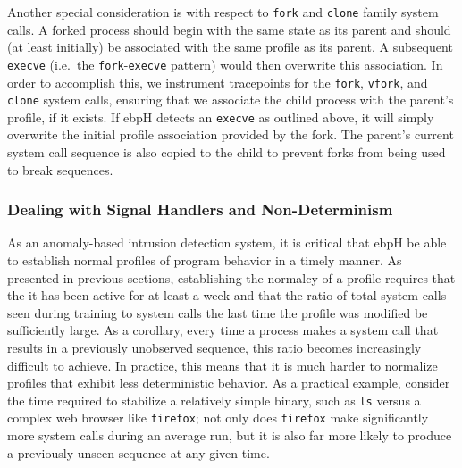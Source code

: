 \documentclass[
  12pt]{findlay}
\begin{document}
Another special consideration is with respect to
\passthrough{\lstinline!fork!} and \passthrough{\lstinline!clone!}
family system calls. A forked process should begin with the same state
as its parent and should (at least initially) be associated with the
same profile as its parent. A subsequent
\passthrough{\lstinline!execve!} (i.e.~the
\passthrough{\lstinline!fork!}-\passthrough{\lstinline!execve!} pattern)
would then overwrite this association. In order to accomplish this, we
instrument tracepoints for the \passthrough{\lstinline!fork!},
\passthrough{\lstinline!vfork!}, and \passthrough{\lstinline!clone!}
system calls, ensuring that we associate the child process with the
parent's profile, if it exists. If ebpH detects an
\passthrough{\lstinline!execve!} as outlined above, it will simply
overwrite the initial profile association provided by the fork. The
parent's current system call sequence is also copied to the child to
prevent forks from being used to break sequences.

\hypertarget{dealing-with-signal-handlers-and-non-determinism}{%
\subsubsection{Dealing with Signal Handlers and
Non-Determinism}\label{dealing-with-signal-handlers-and-non-determinism}}

As an anomaly-based intrusion detection system, it is critical that ebpH
be able to establish normal profiles of program behavior in a timely
manner. As presented in previous sections, establishing the normalcy of
a profile requires that the it has been active for at least a week and
that the ratio of total system calls seen during training to system
calls the last time the profile was modified be sufficiently large. As a
corollary, every time a process makes a system call that results in a
previously unobserved sequence, this ratio becomes increasingly
difficult to achieve. In practice, this means that it is much harder to
normalize profiles that exhibit less deterministic behavior. As a
practical example, consider the time required to stabilize a relatively
simple binary, such as \passthrough{\lstinline!ls!} versus a complex web
browser like \passthrough{\lstinline!firefox!}; not only does
\passthrough{\lstinline!firefox!} make significantly more system calls
during an average run, but it is also far more likely to produce a
previously unseen sequence at any given time.
\end{document}

